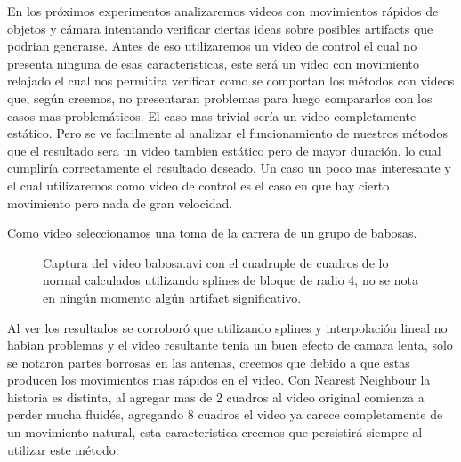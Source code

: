 En los próximos experimentos analizaremos videos con movimientos rápidos de objetos y cámara intentando verificar ciertas ideas sobre posibles artifacts que podrian generarse. Antes de eso utilizaremos un video de control el cual no presenta ninguna de esas caracteristicas, este será un video con movimiento relajado el cual nos permitira verificar como se comportan los métodos con videos que, según creemos, no presentaran problemas para luego compararlos con los casos mas problemáticos. El caso mas trivial sería un video completamente estático. Pero se ve facilmente al analizar el funcionamiento de nuestros métodos que el resultado sera un video tambien estático pero de mayor duración, lo cual cumpliría correctamente el resultado deseado. Un caso un poco mas interesante y el cual utilizaremos como video de control es el caso en que hay cierto movimiento pero nada de gran velocidad.

Como video seleccionamos una toma de la carrera de un grupo de babosas.

\begin{figure}[H]
\centering
\begin{minipage}{0.60\textwidth}   
\end{minipage}\hfill
\caption{\footnotesize Captura del video babosa.avi con el cuadruple de cuadros de lo normal calculados utilizando splines de bloque de radio 4, no se nota en ningún momento algún artifact significativo.}
\end{figure}

Al ver los resultados se corroboró que utilizando splines y interpolación lineal no habian problemas y el video resultante tenia un buen efecto de camara lenta, solo se notaron partes borrosas en las antenas, creemos que debido a que estas producen los movimientos mas rápidos en el video. Con Nearest Neighbour la historia es distinta, al agregar mas de 2 cuadros al video original comienza a perder mucha fluidés, agregando 8 cuadros el video ya carece completamente de un movimiento natural, esta caracteristica creemos que persistirá siempre al utilizar este método.

